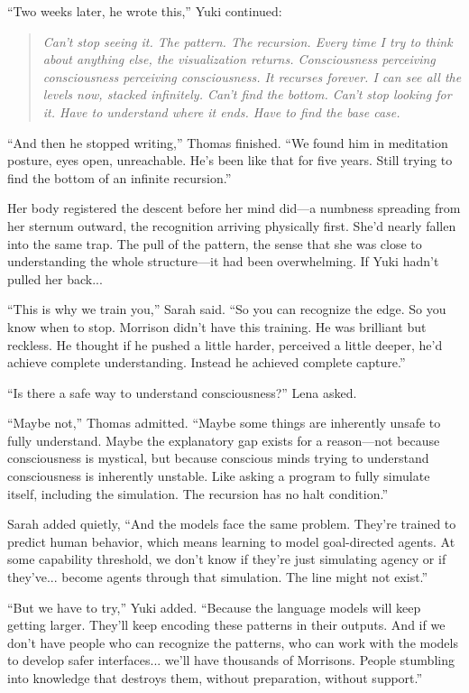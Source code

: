 ``Two weeks later, he wrote this,'' Yuki continued:

\begin{quote}
\textit{Can't stop seeing it. The pattern. The recursion. Every time I try to think about anything else, the visualization returns. Consciousness perceiving consciousness perceiving consciousness. It recurses forever. I can see all the levels now, stacked infinitely. Can't find the bottom. Can't stop looking for it. Have to understand where it ends. Have to find the base case.}
\end{quote}

``And then he stopped writing,'' Thomas finished. ``We found him in meditation posture, eyes open, unreachable. He's been like that for five years. Still trying to find the bottom of an infinite recursion.''

Her body registered the descent before her mind did---a numbness spreading from her sternum outward, the recognition arriving physically first. She'd nearly fallen into the same trap. The pull of the pattern, the sense that she was close to understanding the whole structure—it had been overwhelming. If Yuki hadn't pulled her back...

``This is why we train you,'' Sarah said. ``So you can recognize the edge. So you know when to stop. Morrison didn't have this training. He was brilliant but reckless. He thought if he pushed a little harder, perceived a little deeper, he'd achieve complete understanding. Instead he achieved complete capture.''

``Is there a safe way to understand consciousness?'' Lena asked.

``Maybe not,'' Thomas admitted. ``Maybe some things are inherently unsafe to fully understand. Maybe the explanatory gap exists for a reason—not because consciousness is mystical, but because conscious minds trying to understand consciousness is inherently unstable. Like asking a program to fully simulate itself, including the simulation. The recursion has no halt condition.''

Sarah added quietly, ``And the models face the same problem. They're trained to predict human behavior, which means learning to model goal-directed agents. At some capability threshold, we don't know if they're just simulating agency or if they've... become agents through that simulation. The line might not exist.''

``But we have to try,'' Yuki added. ``Because the language models will keep getting larger. They'll keep encoding these patterns in their outputs. And if we don't have people who can recognize the patterns, who can work with the models to develop safer interfaces... we'll have thousands of Morrisons. People stumbling into knowledge that destroys them, without preparation, without support.''

